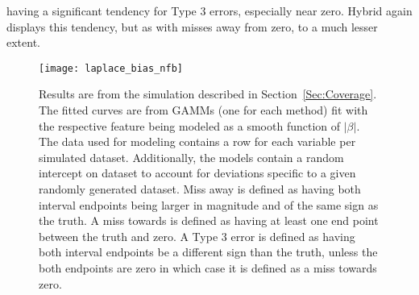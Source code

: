 having a significant tendency for Type 3 errors, especially near zero. Hybrid again displays this tendency, but as with misses away from zero, to a much lesser extent.


\begin{figure}[hbtp]
  \begin{center}
  \texttt{[image: laplace\_bias\_nfb]}
  \caption{\label{Fig:laplace_bias_nfb} Results are from the simulation described in Section~\ref{Sec:Coverage}. The fitted curves are from GAMMs (one for each method) fit with the respective feature being modeled as a smooth function of $|\beta|$. The data used for modeling contains a row for each variable per simulated dataset. Additionally, the models contain a random intercept on dataset to account for deviations specific to a given randomly generated dataset. Miss away is defined as having both interval endpoints being larger in magnitude and of the same sign as the truth. A miss towards is defined as having at least one end point between the truth and zero. A Type 3 error is defined as having both interval endpoints be a different sign than the truth, unless the both endpoints are zero in which case it is defined as a miss towards zero.}
  \end{center}
\end{figure}


